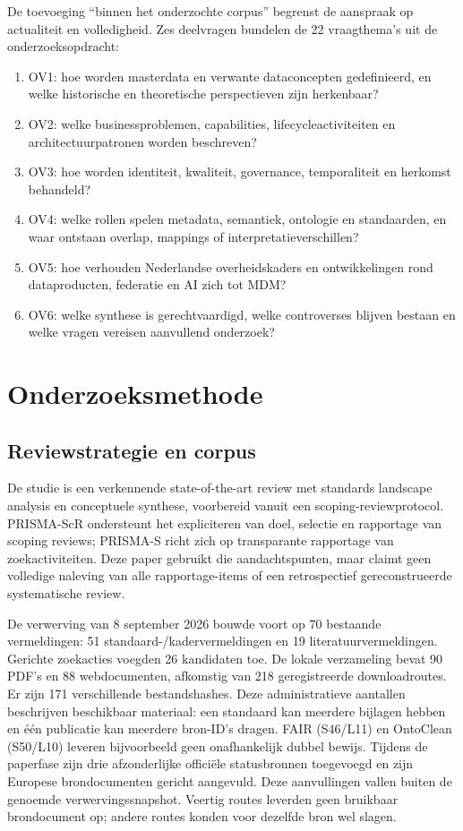 De toevoeging ``binnen het onderzochte corpus'' begrenst de aanspraak op actualiteit en volledigheid. Zes deelvragen bundelen de 22 vraagthema's uit de onderzoeksopdracht:
\begin{enumerate}
\item OV1: hoe worden masterdata en verwante dataconcepten gedefinieerd, en welke historische en theoretische perspectieven zijn herkenbaar?
\item OV2: welke businessproblemen, capabilities, lifecycleactiviteiten en architectuurpatronen worden beschreven?
\item OV3: hoe worden identiteit, kwaliteit, governance, temporaliteit en herkomst behandeld?
\item OV4: welke rollen spelen metadata, semantiek, ontologie en standaarden, en waar ontstaan overlap, mappings of interpretatieverschillen?
\item OV5: hoe verhouden Nederlandse overheidskaders en ontwikkelingen rond dataproducten, federatie en AI zich tot MDM?
\item OV6: welke synthese is gerechtvaardigd, welke controverses blijven bestaan en welke vragen vereisen aanvullend onderzoek?
\end{enumerate}

\section{Onderzoeksmethode}
\subsection{Reviewstrategie en corpus}
De studie is een verkennende state-of-the-art review met standards landscape analysis en conceptuele synthese, voorbereid vanuit een scoping-reviewprotocol. PRISMA-ScR ondersteunt het expliciteren van doel, selectie en rapportage van scoping reviews; PRISMA-S richt zich op transparante rapportage van zoekactiviteiten. Deze paper gebruikt die aandachtspunten, maar claimt geen volledige naleving van alle rapportage-items of een retrospectief gereconstrueerde systematische review. \parencite{M01,M02}

De verwerving van 8 september 2026 bouwde voort op 70 bestaande vermeldingen: 51 standaard-/kadervermeldingen en 19 literatuurvermeldingen. Gerichte zoekacties voegden 26 kandidaten toe. De lokale verzameling bevat 90 PDF's en 88 webdocumenten, afkomstig van 218 geregistreerde downloadroutes. Er zijn 171 verschillende bestandshashes. Deze administratieve aantallen beschrijven beschikbaar materiaal: een standaard kan meerdere bijlagen hebben en één publicatie kan meerdere bron-ID's dragen. FAIR (S46/L11) en OntoClean (S50/L10) leveren bijvoorbeeld geen onafhankelijk dubbel bewijs. Tijdens de paperfase zijn drie afzonderlijke officiële statusbronnen toegevoegd en zijn Europese brondocumenten gericht aangevuld. Deze aanvullingen vallen buiten de genoemde verwervingssnapshot. Veertig routes leverden geen bruikbaar brondocument op; andere routes konden voor dezelfde bron wel slagen.

